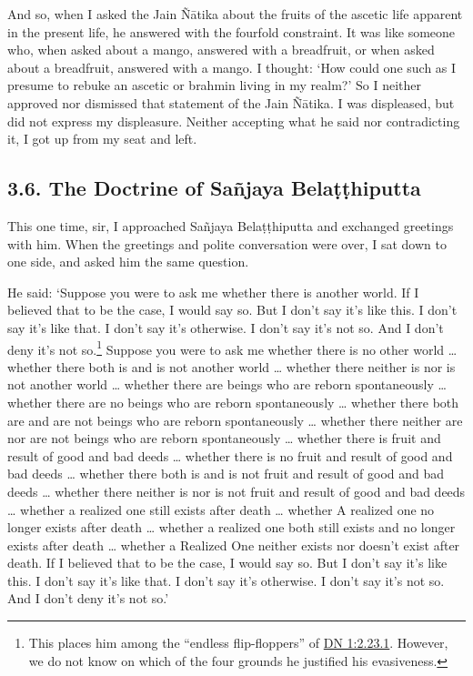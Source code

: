 \documentclass[12pt,openany]{book}%
\begin{document}
And so, when I asked the Jain \textsanskrit{Ñātika} about the fruits of the ascetic life apparent in the present life, he answered with the fourfold constraint. It was like someone who, when asked about a mango, answered with a breadfruit, or when asked about a breadfruit, answered with a mango. I thought: ‘How could one such as I presume to rebuke an ascetic or brahmin living in my realm?’ So I neither approved nor dismissed that statement of the Jain \textsanskrit{Ñātika}. I was displeased, but did not express my displeasure. Neither accepting what he said nor contradicting it, I got up from my seat and left. 

\subsection*{3.6. The Doctrine of \textsanskrit{Sañjaya} \textsanskrit{Belaṭṭhiputta} }

This one time, sir, I approached \textsanskrit{Sañjaya} \textsanskrit{Belaṭṭhiputta} and exchanged greetings with him. When the greetings and polite conversation were over, I sat down to one side, and asked him the same question. 

He said: ‘Suppose you were to ask me whether there is another world. If I believed that to be the case, I would say so. But I don’t say it’s like this. I don’t say it’s like that. I don’t say it’s otherwise. I don’t say it’s not so. And I don’t deny it’s not so.\footnote{This places him among the “endless flip-floppers” of \href{https://suttacentral.net/dn1/en/sujato\#2.23.1}{DN 1:2.23.1}. However, we do not know on which of the four grounds he justified his evasiveness. } Suppose you were to ask me whether there is no other world … whether there both is and is not another world … whether there neither is nor is not another world … whether there are beings who are reborn spontaneously … whether there are no beings who are reborn spontaneously … whether there both are and are not beings who are reborn spontaneously … whether there neither are nor are not beings who are reborn spontaneously … whether there is fruit and result of good and bad deeds … whether there is no fruit and result of good and bad deeds … whether there both is and is not fruit and result of good and bad deeds … whether there neither is nor is not fruit and result of good and bad deeds … whether a realized one still exists after death … whether A realized one no longer exists after death … whether a realized one both still exists and no longer exists after death … whether a Realized One neither exists nor doesn’t exist after death. If I believed that to be the case, I would say so. But I don’t say it’s like this. I don’t say it’s like that. I don’t say it’s otherwise. I don’t say it’s not so. And I don’t deny it’s not so.’ 
\end{document}
